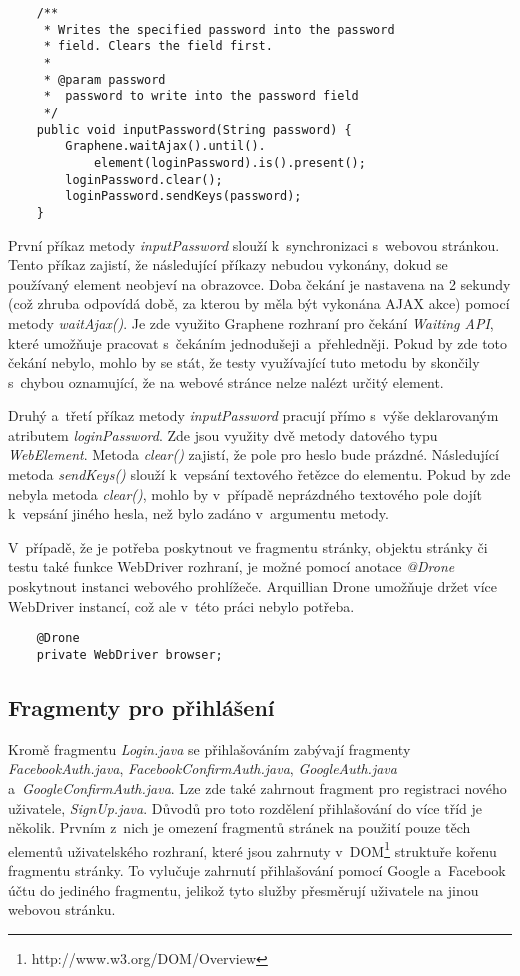 \documentclass[
    color,   %
	table,   %
    twoside, %
    nolot, nolof,
]{fithesis3}
\begin{document}
\begin{lstlisting}
	/**
	 * Writes the specified password into the password 
	 * field. Clears the field first.
	 * 
	 * @param password
	 * 	password to write into the password field
	 */
	public void inputPassword(String password) {
		Graphene.waitAjax().until().
			element(loginPassword).is().present();
		loginPassword.clear();
		loginPassword.sendKeys(password);
	}
\end{lstlisting} 

První příkaz metody \emph{inputPassword} slouží k~synchronizaci s~webovou stránkou. Tento příkaz zajistí, že následující příkazy nebudou vykonány, dokud se používaný element neobjeví na obrazovce. Doba čekání je nastavena na 2 sekundy (což zhruba odpovídá době, za kterou by měla být vykonána AJAX akce) pomocí metody \emph{waitAjax()}. Je zde využito Graphene rozhraní pro čekání \emph{Waiting API}, které umožňuje pracovat s~čekáním jednodušeji a~přehledněji.  Pokud by zde toto čekání nebylo, mohlo by se stát, že testy využívající tuto metodu by skončily s~chybou oznamující, že na webové stránce nelze nalézt určitý element.

Druhý a~třetí příkaz metody \emph{inputPassword} pracují přímo s~výše deklarovaným atributem \emph{loginPassword}. Zde jsou využity dvě metody datového typu \emph{WebElement}. Metoda \emph{clear()} zajistí, že pole pro heslo bude prázdné. Následující metoda \emph{sendKeys()} slouží k~vepsání textového řetězce do elementu. Pokud by zde nebyla metoda \emph{clear()}, mohlo by v~případě neprázdného textového pole dojít k~vepsání jiného hesla, než bylo zadáno v~argumentu metody.

V~případě, že je potřeba poskytnout ve fragmentu stránky, objektu stránky či testu také funkce WebDriver rozhraní, je možné pomocí anotace \emph{@Drone} poskytnout instanci webového prohlížeče. Arquillian Drone umožňuje držet více WebDriver instancí, což ale v~této práci nebylo potřeba.

\begin{lstlisting}
	@Drone
	private WebDriver browser;
\end{lstlisting} 

\subsection*{Fragmenty pro přihlášení}
Kromě fragmentu \emph{Login.java} se přihlašováním zabývají fragmenty \emph{FacebookAuth.java}, \emph{FacebookConfirmAuth.java}, \emph{GoogleAuth.java} a~\emph{GoogleConfirmAuth.java}. Lze zde také zahrnout fragment pro registraci nového uživatele, \emph{SignUp.java}. Důvodů pro toto rozdělení přihlašování do více tříd je několik. Prvním z~nich je omezení fragmentů stránek na použití pouze těch elementů uživatelského rozhraní, které jsou zahrnuty v~DOM\footnote{http://www.w3.org/DOM/Overview} struktuře kořenu fragmentu stránky. To vylučuje zahrnutí přihlašování pomocí Google a~Facebook účtu do jediného fragmentu, jelikož tyto služby přesměrují uživatele na jinou webovou stránku.
\end{document}
